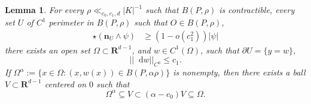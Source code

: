 \documentclass[reqno,10pt]{amsart}
\newcommand{\RR}{\mathbf{R}}
\newcommand*\dif{\mathop{}\!\mathrm{d}}
\newcommand{\normal}{\mathbf n}
\newtheorem{lemma}[theorem]{Lemma}
\theoremstyle{definition}
\numberwithin{equation}{section}
\begin{document}
\begin{lemma}\label{rep as a good graph}
For every $\rho \ll_{c_0, c_1, d} |K|^{-1}$ such that $B(P, \rho)$ is contractible, every set $U$ of $C^1$ perimeter in $B(P, \rho)$ such that $O \in B(P, \rho)$,
\begin{align}
\star(\normal_U \wedge \psi) &\geq (1 - o(c_1^2))|\psi| \label{rep as a good graph hyp}
\end{align}
there exists an open set $\Omega \subset \RR^{d - 1}$, and $w \in C^1(\Omega)$, such that $\partial U = \{y = w\}$,
\begin{equation}\label{rep as a good graph small derivative}
||\dif w||_{C^0} \leq c_1.
\end{equation}
If $\Omega^\alpha := \{x \in \Omega: (x, w(x)) \in B(P, \alpha \rho)\}$ is nonempty, then there exists a ball $V \subset \RR^{d - 1}$ centered on $0$ such that
\begin{equation}\label{rep as a good graph set nests}
    \Omega^\alpha \subseteq V \subset (\alpha - c_0) V \subseteq \Omega.
\end{equation}
\end{lemma}
\end{document}
